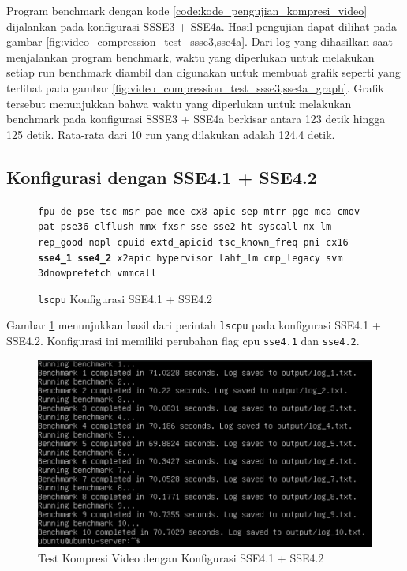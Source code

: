 Program benchmark dengan kode \ref{code:kode_pengujian_kompresi_video} dijalankan pada konfigurasi SSSE3 + SSE4a. Hasil pengujian dapat dilihat pada gambar \ref{fig:video_compression_test_ssse3,sse4a}. Dari log yang dihasilkan saat menjalankan program benchmark, waktu yang diperlukan untuk melakukan setiap run benchmark diambil dan digunakan untuk membuat grafik seperti yang terlihat pada gambar \ref{fig:video_compression_test_ssse3,sse4a_graph}. Grafik tersebut menunjukkan bahwa waktu yang diperlukan untuk melakukan benchmark pada konfigurasi SSSE3 + SSE4a berkisar antara 123 detik hingga 125 detik. Rata-rata dari 10 run yang dilakukan adalah 124.4 detik.

\subsection{Konfigurasi dengan SSE4.1 + SSE4.2}
\begin{figure}
    \texttt{fpu de pse tsc msr pae mce cx8 apic sep mtrr pge mca cmov pat pse36 clflush mmx fxsr sse sse2 ht syscall nx lm rep\_good nopl cpuid extd\_apicid tsc\_known\_freq pni cx16 \textbf{sse4\_1} \textbf{sse4\_2} x2apic hypervisor lahf\_lm cmp\_legacy svm 3dnowprefetch vmmcall}
    \caption{\texttt{lscpu} Konfigurasi SSE4.1 + SSE4.2}
    \label{fig:lscpu_video_compression_test_sse4.1,sse4.2}
\end{figure}

Gambar \ref{fig:lscpu_video_compression_test_sse4.1,sse4.2} menunjukkan hasil dari perintah \texttt{lscpu} pada konfigurasi SSE4.1 + SSE4.2. Konfigurasi ini memiliki perubahan flag cpu \texttt{sse4.1} dan \texttt{sse4.2}.

\begin{figure}
    \centering
    \includegraphics[width=1\textwidth]
    {assets/pics/video-compression-test/sse4.1,sse4.2.jpeg}
    \caption{Test Kompresi Video dengan Konfigurasi SSE4.1 + SSE4.2}
    \label{fig:video_compression_test_sse4.1,sse4.2}
\end{figure}

